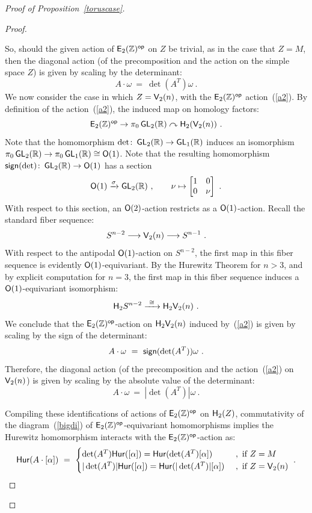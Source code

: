 \begin{proof}[Proof of Proposition~\ref{toruscase}]
\begin{proof}
\begin{itemize}
\end{itemize}
So, should the given action of $\mathsf E_2(\mathbb Z)^{\operatorname{\mathsf{op}}}$ on $Z$ be trivial, as in the case that $Z=M$, then the diagonal action (of the precomposition and the action on the simple space $Z$) is given by scaling by the determinant:
\[
A \cdot \omega
~=~
\det(A^T) \omega
~.
\]
We now consider the case in which $Z=\mathsf V_2(n)$, with the $\mathsf E_2(\mathbb Z)^{\operatorname{\mathsf{op}}}$ action~(\ref{a2}).
By definition of the action~(\ref{a2}), the induced map on homology factors:
\[
\mathsf E_2(\mathbb Z)^{\operatorname{\mathsf{op}}}
\to
\pi_0 \operatorname{\sf GL}_2(\mathbb R)
\curvearrowright
\mathsf H_2( \mathsf V_2(n)) 
~.
\]
Note that the homomorphism $\det \colon \operatorname{\sf GL}_2(\mathbb R)\to \operatorname{\sf GL}_1(\mathbb R)$ induces an isomorphism $\pi_0 \operatorname{\sf GL}_2(\mathbb R) \to \pi_0 \operatorname{\sf GL}_1(\mathbb R) \cong \mathsf O(1)$.
Note that the resulting homomorphism ${\sf sign}(\det) \colon \operatorname{\sf GL}_2(\mathbb R) \to \mathsf O(1)$ has a section 
\[
\mathsf O(1) \xrightarrow{\sigma} \operatorname{\sf GL}_2(\mathbb R)
~,\qquad
\nu
\mapsto
\begin{bmatrix}
1 & 0
\\
0 & \nu
\end{bmatrix}
~.
\]
With respect to this section, an $\mathsf O(2)$-action restricts as a $\mathsf O(1)$-action.
Recall the standard fiber sequence:
\[
S^{n-2}
\longrightarrow
\mathsf V_2(n)
\longrightarrow
S^{n-1}
~.
\]
With respect to the antipodal $\mathsf O(1)$-action on $S^{n-2}$, 
the first map in this fiber sequence is evidently $\mathsf O(1)$-equivariant.  
By the Hurewitz Theorem for $n>3$, and by explicit computation for $n=3$, the first map in this fiber sequence induces a $\mathsf O(1)$-equivariant isomorphism:
\[
\mathsf H_2 S^{n-2}
\xrightarrow{~\cong~}
\mathsf H_2 \mathsf V_2(n) 
~.
\]
We conclude that the $\mathsf E_2(\mathbb Z)^{\operatorname{\mathsf{op}}}$-action on $\mathsf H_2 \mathsf V_2(n)$ induced by~(\ref{a2}) is given by scaling by the sign of the determinant:
\[
A
\cdot
\omega
~=~
{\sf sign}( \det(A^T)) \omega
~.
\]
Therefore, 
the diagonal action (of the precomposition and the action~(\ref{a2}) on $\mathsf V_2(n)$) is given by scaling by the absolute value of the determinant:
\[
A \cdot \omega
~=~
| \det(A^T)| \omega
~.
\]



Compiling these identifications of actions of $\mathsf E_2(\mathbb Z)^{\operatorname{\mathsf{op}}}$ on $\mathsf H_2(Z)$, 
commutativity of the diagram~(\ref{bigdi}) of $\mathsf E_2(\mathbb Z)^{\operatorname{\mathsf{op}}}$-equivariant homomorphisms implies
the Hurewitz homomorphism interacts with the $\mathsf E_2(\mathbb Z)^{\operatorname{\mathsf{op}}}$-action as:
\[
{\sf Hur}(A \cdot [\alpha]) 
~=~ 
\begin{cases}
\det(A^T) {\sf Hur}( [\alpha]) = {\sf Hur}( \det(A^T)[\alpha])
&
~,
\text{ if }Z=M
\\
| \det(A^T) | {\sf Hur}( [\alpha]) 
=
{\sf Hur}( | \det(A^T)| [\alpha])
&
~,
\text{ if }Z=\mathsf V_2(n)
\end{cases}
~.
\]







\end{proof}
\end{proof}
